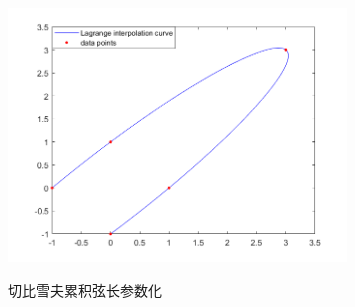 \documentclass[utf8]{ctexart}
\begin{document}
\begin{itemize}
    \begin{figure}[H]
        \centering
        \includegraphics[width=0.8\textwidth]{lagrange_2d_cheby.png}
        \label{fig3}
        \caption{切比雪夫累积弦长参数化}
    \end{figure}


\end{itemize}
\end{document}
